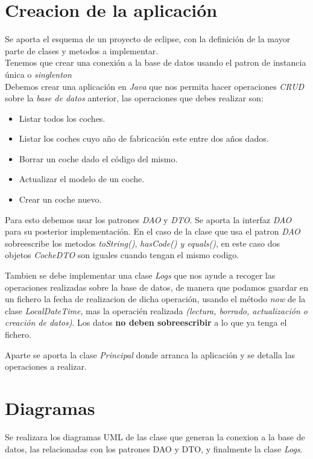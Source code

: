 \documentclass[4paper]{article}
\begin{document}
\section*{Creacion de la aplicación}
Se aporta el esquema de un proyecto de eclipse, con la definición de la mayor parte de clases y metodos a implementar.\\
Tenemos que crear una conexión a la base de datos usando el patron de instancia única o \emph{singlenton} \\
Debemos crear una aplicación en \emph{Java} que nos permita hacer operaciones \emph{CRUD} sobre la \emph{base de datos} anterior, las operaciones que debes realizar son:
\begin{itemize}
\item Listar todos los coches.
\item Listar los coches cuyo año de fabricación este entre dos años dados.
\item Borrar un coche dado el código del mismo.
\item Actualizar el modelo de un coche.
\item Crear un coche  nuevo.
\end{itemize}
Para esto debemos usar los patrones \emph{DAO} y \emph{DTO}. Se aporta la interfaz \emph{DAO} para su posterior implementación. En el caso de la clase que usa el patron \emph{DAO} sobreescribe los metodos \emph{toString()}, \emph{hasCode() y equals()}, en este caso dos objetos \emph{CocheDTO} son iguales cuando tengan el mismo codigo.
\par 
Tambien se debe implementar una clase \emph{Logs} que nos ayude a recoger las operaciones realizadas sobre la base de datos, de manera que podamos guardar en un fichero la fecha de realizacion de dicha operación, usando el método \emph{now} de la clase \emph{LocalDateTime}, mas la operacién realizada \emph{(lectura, borrado, actualización o creación de datos)}. Los datos \textbf{no deben sobreescribir} a lo que ya tenga el fichero.\par
Aparte se aporta la clase \emph{Principal} donde arranca la aplicación y se detalla las operaciones a realizar.

\section*{Diagramas}
Se realizara los diagramas UML de las clase que generan la conexion a la base de datos, las relacionadas con los patrones DAO y DTO, y finalmente la clase \emph{Logs}.
\end{document}
